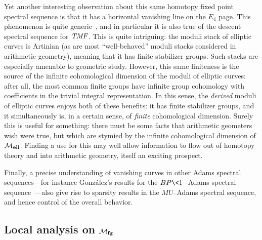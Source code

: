 Yet another interesting observation about this same homotopy fixed point spectral sequence is that it has a horizontal vanishing line on the \(E_4\) page.
This phenomenon is quite generic~\cite{MathewMeier}, and in particular it is also true of the descent spectral sequence for \(\mathit{TMF}\).
This is quite intriguing: the moduli stack of elliptic curves is Artinian (as are most ``well-behaved'' moduli stacks considered in arithmetic geometry), meaning that it has finite stabilizer groups.
Such stacks are especially amenable to geometric study.
However, this same finiteness is the source of the infinite cohomological dimension of the moduli of elliptic curves: after all, the most common finite groups have infinite group cohomology with coefficients in the trivial integral representation.
In this sense, the \emph{derived} moduli of elliptic curves enjoys both of these benefits: it has finite stabilizer groups, and it simultaneously is, in a certain sense, of \emph{finite} cohomological dimension.
Surely this is useful for something: there must be some facts that arithmetic geometers wish were true, but which are stymied by the infinite cohomological dimension of \(\mathcal{M}_{\mathbf{ell}}\).
Finding a use for this may well allow information to flow out of homotopy theory and into arithmetic geometry, itself an exciting prospect.

Finally, a precise understanding of vanishing curves in other Adams spectral sequences---for instance Gonz\'{a}lez's results for the \(BP\<1\>\)--Adams spectral sequence~\cite{Gonzalez}---also give rise to sparsity results in the \(MU\)--Adams spectral sequence, and hence control of the overall behavior.







\subsection*{Local analysis on \(\mathcal{M}_{\mathbf{fg}}\)}

